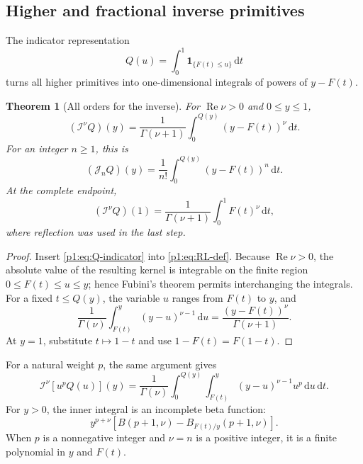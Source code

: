 \documentclass[11pt,oneside]{article}
\newtheorem{theorem}{Theorem}[section]
\theoremstyle{definition}
\theoremstyle{remark}
\newcommand{\dd}{\,\mathrm d}
\newcommand{\Jn}{\mathcal J}
\newcommand{\RL}{\mathcal I}
\newcommand{\1}{\mathbf 1}
\DeclareMathOperator{\Rea}{Re}
\begin{document}
\subsection{Higher and fractional inverse primitives}
The indicator representation
\begin{equation}
 Q(u)=\int_0^1\1_{\{F(t)\leq u\}}\dd t                         \label{p1:eq:Q-indicator}
\end{equation}
turns all higher primitives into one-dimensional integrals of powers of
\(y-F(t)\).

\begin{theorem}[All orders for the inverse]\label{p1:thm:inverse-all-orders}
For \(\Rea\nu>0\) and \(0\leq y\leq1\),
\begin{equation}
 \boxed{\quad
 (\RL^\nu Q)(y)
 =\frac1{\Gamma(\nu+1)}
 \int_0^{Q(y)}(y-F(t))^\nu\dd t.
 \quad}                                                        \label{p1:eq:inverse-fractional}
\end{equation}
For an integer \(n\geq1\), this is
\begin{equation}
 (\Jn_nQ)(y)=\frac1{n!}\int_0^{Q(y)}(y-F(t))^n\dd t.           \label{p1:eq:inverse-integer-n}
\end{equation}
At the complete endpoint,
\begin{equation}
 (\RL^\nu Q)(1)
 =\frac1{\Gamma(\nu+1)}\int_0^1F(t)^\nu\dd t,                 \label{p1:eq:inverse-fractional-one}
\end{equation}
where reflection was used in the last step.
\end{theorem}

\begin{proof}
Insert \eqref{p1:eq:Q-indicator} into \eqref{p1:eq:RL-def}.  Because
\(\Rea\nu>0\), the absolute value of the resulting kernel is integrable on
the finite region \(0\leq F(t)\leq u\leq y\); hence Fubini's theorem permits
interchanging the integrals.  For a fixed \(t\leq Q(y)\), the variable \(u\)
ranges from \(F(t)\) to \(y\), and
\[
 \frac1{\Gamma(\nu)}\int_{F(t)}^y(y-u)^{\nu-1}\dd u
 =\frac{(y-F(t))^\nu}{\Gamma(\nu+1)}.
\]
At \(y=1\), substitute \(t\mapsto1-t\) and use
\(1-F(t)=F(1-t)\).
\end{proof}

For a natural weight \(p\), the same argument gives
\begin{equation}
 \boxed{\quad
 \RL^\nu[u^pQ(u)](y)
 =\frac1{\Gamma(\nu)}\int_0^{Q(y)}
 \int_{F(t)}^y(y-u)^{\nu-1}u^p\dd u\dd t.
 \quad}                                                        \label{p1:eq:inverse-weighted-fractional}
\end{equation}
For \(y>0\), the inner integral is an incomplete beta function:
\begin{equation}
 y^{p+\nu}
 \left[B(p+1,\nu)-B_{F(t)/y}(p+1,\nu)\right].                 \label{p1:eq:inverse-beta}
\end{equation}
When \(p\) is a nonnegative integer and \(\nu=n\) is a positive integer, it
is a finite polynomial in \(y\) and \(F(t)\).
\end{document}
